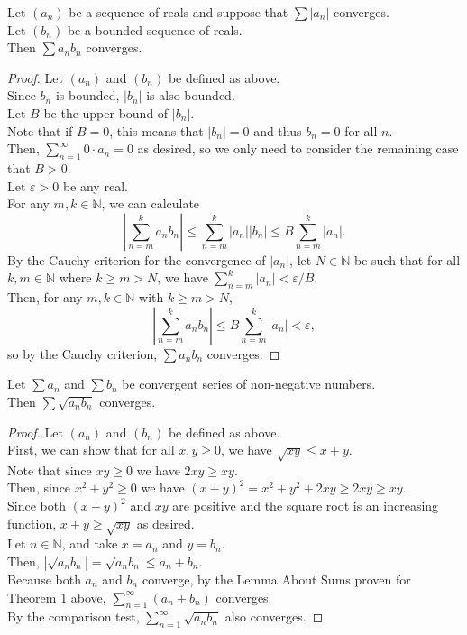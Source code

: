 \documentclass{article}
\newenvironment{theorem}[1]{\renewcommand\theinnercustomthm{#1}\innercustomthm}
  {\endinnercustomthm}
\begin{document}
\begin{theorem}{4}
    Let $(a_n)$ be a sequence of reals and suppose that $\sum |a_n|$ converges. \\
    Let $(b_n)$ be a bounded sequence of reals. \\
    Then $\sum a_n b_n$ converges.
\end{theorem}
\begin{proof}
    Let $(a_n)$ and $(b_n)$ be defined as above. \\
    Since $b_n$ is bounded, $|b_n|$ is also bounded. \\
    Let $B$ be the upper bound of $|b_n|$. \\
    Note that if $B = 0$, this means that $|b_n| = 0$ and thus $b_n = 0$ for all $n$. \\
    Then, $\sum\limits_{n=1}^\infty 0\cdot a_n = 0$ as desired, so we only need to consider the remaining case that $B> 0$.\\
    Let $\varepsilon > 0$ be any real. \\
    For any $m,k \in \mathbb N$, we can calculate
    \[\left|\sum_{n=m}^k a_n b_n\right| \le \sum_{n=m}^k |a_n||b_n| \le B\sum_{n=m}^k |a_n|.\]
    By the Cauchy criterion for the convergence of $|a_n|$, let $N \in \mathbb N$ be such that for all $k,m \in \mathbb N$ where $k \ge m > N$, we have $\sum\limits_{n=m}^k |a_n| < \varepsilon/B$. \\
    Then, for any $m,k \in \mathbb N$ with $k \ge m > N$,
    \[\left|\sum_{n=m}^k a_n b_n\right| \le B \sum_{n=m}^k |a_n| < \varepsilon,\]
    so by the Cauchy criterion, $\sum a_n b_n$ converges.
\end{proof}

\newpage{}
\begin{theorem}{5}
    Let $\sum a_n$ and $\sum b_n$ be convergent series of non-negative numbers. \\
    Then $\sum \sqrt{a_n b_n}$ converges.
\end{theorem}
\begin{proof}
    Let $(a_n)$ and $(b_n)$ be defined as above. \\
    First, we can show that for all $x,y\ge 0$, we have $\sqrt{xy} \le x + y$. \\
    Note that since $xy\ge0$ we have $2xy\ge xy$. \\
    Then, since $x^2 +y^2 \ge 0$ we have $(x+y)^2=x^2+y^2+2xy \ge 2xy \ge xy$. \\
    Since both $(x+y)^2$ and $xy$ are positive and the square root is an increasing function, $x+y\ge \sqrt{xy}$ as desired. \\
    Let $n \in \mathbb N$, and take $x = a_n$ and $y = b_n$. \\
    Then, $|\sqrt{a_n b_n}| = \sqrt{a_n b_n} \le a_n + b_n$. \\
    Because both $a_n$ and $b_n$ converge, by the Lemma About Sums proven for Theorem 1 above, $\sum\limits_{n=1}^\infty (a_n+b_n)$ converges. \\ By the comparison test, $\sum\limits_{n=1}^\infty \sqrt{a_n b_n}$ also converges.
\end{proof}
\end{document}
